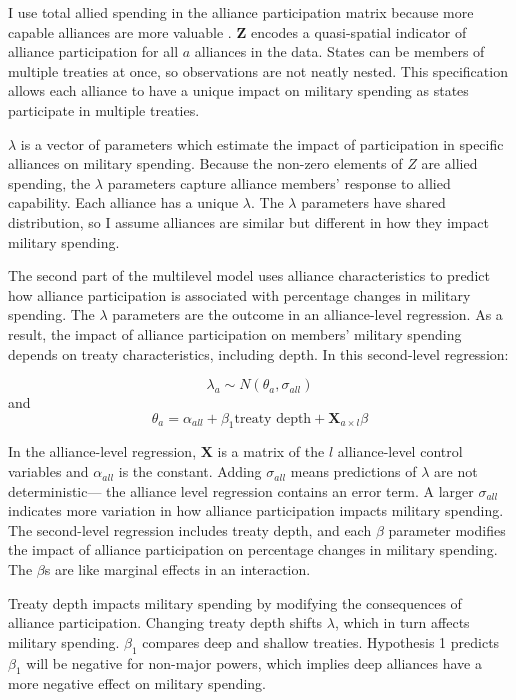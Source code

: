 \documentclass[12pt]{article}
\begin{document}
I use total allied spending in the alliance participation matrix because more capable alliances are more valuable \citep{Johnsonetal2015}. 
$\textbf{Z}$ encodes a quasi-spatial indicator of alliance participation for all $a$ alliances in the data. 
States can be members of multiple treaties at once, so observations are not neatly nested. 
This specification allows each alliance to have a unique impact on military spending as states participate in multiple treaties. 


$\lambda$ is a vector of parameters which estimate the impact of participation in specific alliances on military spending. 
Because the non-zero elements of $Z$ are allied spending, the $\lambda$ parameters capture alliance members' response to allied capability. 
Each alliance has a unique $\lambda$. 
The $\lambda$ parameters have shared distribution, so I assume alliances are similar but different in how they impact military spending. 


The second part of the multilevel model uses alliance characteristics to predict how alliance participation is associated with percentage changes in military spending. 
The $\lambda$ parameters are the outcome in an alliance-level regression.
As a result, the impact of alliance participation on members' military spending depends on treaty characteristics, including depth. 
In this second-level regression: 


\begin{equation}
\lambda_{a} \sim N(\theta_{a}, \sigma_{all})
\end{equation} 
and 
\begin{equation}
\theta_{a} = \alpha_{all} + \beta_1 \mbox{treaty depth} + \textbf{X}_{a \times l} \beta
\end{equation}


In the alliance-level regression, $\textbf{X}$ is a matrix of the $l$ alliance-level control variables and $\alpha_{all}$ is the constant.
Adding $\sigma_{all}$ means predictions of $\lambda$ are not deterministic--- the alliance level regression contains an error term. 
A larger $\sigma_{all}$ indicates more variation in how alliance participation impacts military spending. 
The second-level regression includes treaty depth, and each $\beta$ parameter modifies the impact of alliance participation on percentage changes in military spending. 
The $\beta$s are like marginal effects in an interaction. 


Treaty depth impacts military spending by modifying the consequences of alliance participation. 
Changing treaty depth shifts $\lambda$, which in turn affects military spending.
$\beta_1$ compares deep and shallow treaties. 
Hypothesis 1 predicts $\beta_1$ will be negative for non-major powers, which implies deep alliances have a more negative effect on military spending. 
\end{document}
